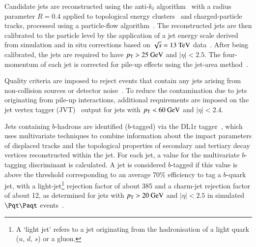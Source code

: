 Candidate jets are reconstructed using the anti-$k_t$ algorithm~\cite{Cacciari:2008gp,Cacciari:2011ma}
with a radius parameter $R=0.4$ applied to topological energy clusters~\cite{Aad:2016upy} and charged-particle tracks, processed using
a particle-flow algorithm~\cite{Aad:2017epj77}. %
The reconstructed jets are then calibrated to the particle level by the application of a jet energy scale 
derived from simulation and in situ corrections based on $\sqrt{s}=13~\text{TeV}$ data~\cite{Aaboud:2017jcu}. %
After being calibrated, the jets are required to have $p_{\text{T}} > 25~\text{GeV}$ and $|\eta| < 2.5$.
The four-momentum of each jet is corrected for pile-up effects using the jet-area method~\cite{Cacciari:2008gn}.

Quality criteria are imposed to reject events that contain any jets arising from non-collision sources
or detector noise~\cite{ATLAS-CONF-2015-029}.  To reduce the contamination due to jets originating from pile-up interactions,
additional requirements are imposed on the jet vertex tagger (JVT)~\cite{Aad:2015ina} output for jets with $p_{\text{T}}<60~\text{GeV}$ and $|\eta| < 2.4$.

Jets containing $b$-hadrons are identified ($b$-tagged) via the DL1r tagger~\cite{Aad:2019epj79,ATL-PHYS-PUB-2017-013}, %
which uses multivariate techniques to combine information about the impact parameters of displaced tracks and the  topological properties 
of secondary and tertiary decay vertices reconstructed within the jet. For each jet, a value for the multivariate $b$-tagging discriminant is 
calculated. A jet is considered $b$-tagged if this value is above the threshold corresponding to
an average 70\% efficiency to tag a $b$-quark jet, with a light-jet\footnote{A `light jet' refers to a jet originating from the hadronisation of a light quark ($u$, $d$, $s$) or a gluon.} rejection factor of about 385 and a charm-jet rejection factor of about 12, as determined for jets with
$p_{\text{T}} >20~\text{GeV}$ and $|\eta|<2.5$ in simulated $\ttbar$ events~\cite{Aad:2019epj79}.

